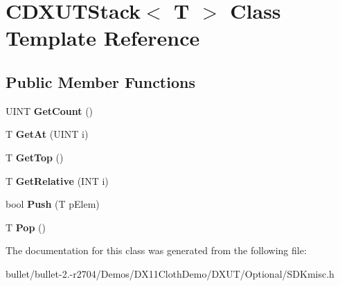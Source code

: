 \hypertarget{class_c_d_x_u_t_stack}{\section{C\+D\+X\+U\+T\+Stack$<$ T $>$ Class Template Reference}
\label{class_c_d_x_u_t_stack}
}
\subsection*{Public Member Functions}
\begin{DoxyCompactItemize}
\item 
\hypertarget{class_c_d_x_u_t_stack_aaf1a2ac4e8f997620c559a1ce77321d2}{U\+I\+N\+T {\bfseries Get\+Count} ()}\label{class_c_d_x_u_t_stack_aaf1a2ac4e8f997620c559a1ce77321d2}

\item 
\hypertarget{class_c_d_x_u_t_stack_a68dffe12d885a6219d058c81625e874d}{T {\bfseries Get\+At} (U\+I\+N\+T i)}\label{class_c_d_x_u_t_stack_a68dffe12d885a6219d058c81625e874d}

\item 
\hypertarget{class_c_d_x_u_t_stack_ae17cebc94f7d7cae0db2c6464c2b9bcc}{T {\bfseries Get\+Top} ()}\label{class_c_d_x_u_t_stack_ae17cebc94f7d7cae0db2c6464c2b9bcc}

\item 
\hypertarget{class_c_d_x_u_t_stack_a483d3997a5378f26d255614d9ff32182}{T {\bfseries Get\+Relative} (I\+N\+T i)}\label{class_c_d_x_u_t_stack_a483d3997a5378f26d255614d9ff32182}

\item 
\hypertarget{class_c_d_x_u_t_stack_ad5df2f8fb4bb9995cd671d9044ec0941}{bool {\bfseries Push} (T p\+Elem)}\label{class_c_d_x_u_t_stack_ad5df2f8fb4bb9995cd671d9044ec0941}

\item 
\hypertarget{class_c_d_x_u_t_stack_aec6527530f2ff6c0c7c068b0254b8097}{T {\bfseries Pop} ()}\label{class_c_d_x_u_t_stack_aec6527530f2ff6c0c7c068b0254b8097}

\end{DoxyCompactItemize}


The documentation for this class was generated from the following file\+:\begin{DoxyCompactItemize}
\item 
bullet/bullet-\/2.-\/r2704/\+Demos/\+D\+X11\+Cloth\+Demo/\+D\+X\+U\+T/\+Optional/S\+D\+Kmisc.\+h\end{DoxyCompactItemize}
